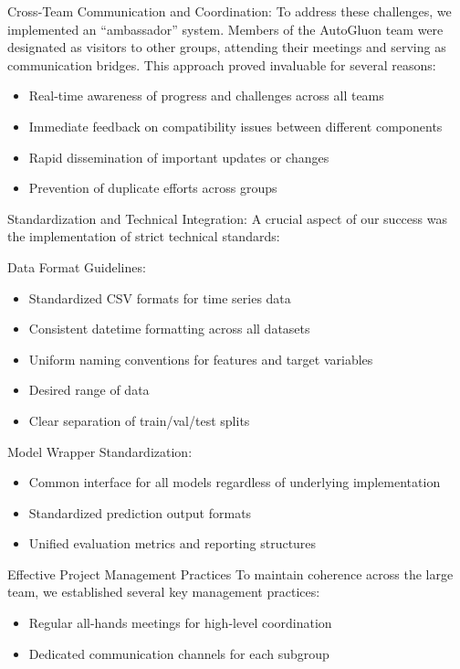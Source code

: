\documentclass[a4paper]{article}
\providecommand{\tightlist}{%
      \setlength{\itemsep}{0pt}\setlength{\parskip}{0pt}}
\begin{document}
Cross-Team Communication and Coordination: To address these challenges,
we implemented an ``ambassador'' system. Members of the AutoGluon team
were designated as visitors to other groups, attending their meetings
and serving as communication bridges. This approach proved invaluable
for several reasons:

\begin{itemize}
\tightlist
\item
  Real-time awareness of progress and challenges across all teams
\item
  Immediate feedback on compatibility issues between different
  components
\item
  Rapid dissemination of important updates or changes
\item
  Prevention of duplicate efforts across groups
\end{itemize}

Standardization and Technical Integration: A crucial aspect of our
success was the implementation of strict technical standards:

Data Format Guidelines:

\begin{itemize}
\tightlist
\item
  Standardized CSV formats for time series data
\item
  Consistent datetime formatting across all datasets
\item
  Uniform naming conventions for features and target variables
\item
  Desired range of data
\item
  Clear separation of train/val/test splits
\end{itemize}

Model Wrapper Standardization:

\begin{itemize}
\tightlist
\item
  Common interface for all models regardless of underlying
  implementation
\item
  Standardized prediction output formats
\item
  Unified evaluation metrics and reporting structures
\end{itemize}

Effective Project Management Practices To maintain coherence across the
large team, we established several key management practices:

\begin{itemize}
\tightlist
\item
  Regular all-hands meetings for high-level coordination
\item
  Dedicated communication channels for each subgroup
\end{itemize}
\end{document}

